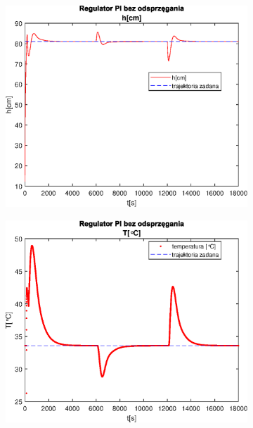 \begin{figure}[h!]
   \centering
   \begin{subfigure}[b]{0.4\textwidth}
      \includegraphics[width=1\linewidth]{img/PI/noDecoupler/disturbance/PINoDecouplerH1.eps}
      \caption{}
      \label{fig:fig:PIDecoupler11}
   \end{subfigure}
       
   \begin{subfigure}[b]{0.4\textwidth}
      \includegraphics[width=1\linewidth]{img/PI/noDecoupler/disturbance/PINoDecouplerT1.eps}
      \caption{}
      \label{fig:fig:PIDecoupler12}
   \end{subfigure}
       

\end{figure}
